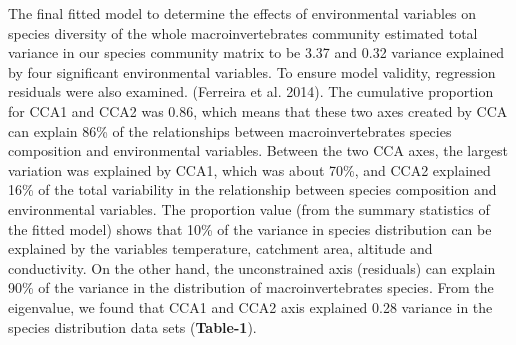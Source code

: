 \documentclass[
]{article}
\begin{document}
The final fitted model to determine the effects of environmental
variables on species diversity of the whole macroinvertebrates community
estimated total variance in our species community matrix to be 3.37 and
0.32 variance explained by four significant environmental variables. To
ensure model validity, regression residuals were also examined.
(Ferreira et al. 2014). The cumulative proportion for CCA1 and CCA2 was
0.86, which means that these two axes created by CCA can explain 86\% of
the relationships between macroinvertebrates species composition and
environmental variables. Between the two CCA axes, the largest variation
was explained by CCA1, which was about 70\%, and CCA2 explained 16\% of
the total variability in the relationship between species composition
and environmental variables. The proportion value (from the summary
statistics of the fitted model) shows that 10\% of the variance in
species distribution can be explained by the variables temperature,
catchment area, altitude and conductivity. On the other hand, the
unconstrained axis (residuals) can explain 90\% of the variance in the
distribution of macroinvertebrates species. From the eigenvalue, we
found that CCA1 and CCA2 axis explained 0.28 variance in the species
distribution data sets (\textbf{Table-1}).
\end{document}
